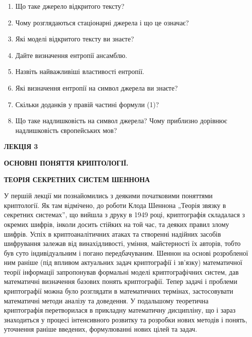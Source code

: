 \documentclass[a4paper]{article}
\newcommand\liststyleWWviiiNumxii{%
\renewcommand\theenumi{\arabic{enumi}}
\renewcommand\theenumii{\alph{enumii}}
\renewcommand\theenumiii{\roman{enumiii}}
\renewcommand\theenumiv{\arabic{enumiv}}
\renewcommand\labelenumi{\theenumi.}
\renewcommand\labelenumii{\theenumii.}
\renewcommand\labelenumiii{\theenumiii.}
\renewcommand\labelenumiv{\theenumiv.}
}
\newcounter{}
\begin{document}
\liststyleWWviiiNumxii
\begin{enumerate}
\item Що таке джерело відкритого тексту?
\item Чому розглядаються стаціонарні джерела і що це означає?
\item Які моделі відкритого тексту ви знаєте?
\item Дайте визначення ентропії ансамблю.
\item Назвіть найважливіші властивості ентропії.
\item Які визначення ентропії на символ джерела ви знаєте?
\item Скільки доданків у правій частині формули (1)?
\item Що таке надлишковість на символ джерела? Чому приблизно дорівнює
надлишковість європейських мов?
\end{enumerate}

\bigskip


\bigskip


\bigskip

{\bfseries
ЛЕКЦІЯ  3}


\bigskip

{\centering\bfseries
ОСНОВНІ ПОНЯТТЯ КРИПТОЛОГІЇ.
\par}

{\centering\bfseries
ТЕОРІЯ СЕКРЕТНИХ СИСТЕМ ШЕННОНА
\par}


\bigskip


\bigskip

У першій лекції ми познайомились з деякими початковими поняттями криптології. Як
там відмічено, до роботи Клода Шеннона „Теорія зв{\textquotesingle}язку в
секретних системах”, що вийшла з друку в 1949 році, криптографія складалася з 
окремих шифрів, інколи досить стійких на той час, та деяких правил злому
шифрів. Успіх в криптоаналітичних атаках та створенні надійних засобів
шифрування  залежав від винахідливості, уміння, майстерності їх авторів, тобто
був суто індивідуальним і погано передбачуваним. Шеннон на основі розробленої
ним раніше (під впливом актуальних задач криптографії і зв’язку) математичної
теорії інформації запропонував формальні моделі криптографічних систем, дав
математичні визначення базових понять криптографії. Тепер задачі і проблеми
криптографії можна було розглядати в математичних термінах, застосовувати
математичні методи аналізу та доведення. У подальшому теоретична криптографія 
перетворилася в прикладну математичну дисципліну, що і зараз знаходиться  у
процесі інтенсивного розвитку та розробки нових методів і понять, уточнення
раніше введених, формулюванні нових цілей та задач. 
\end{document}
